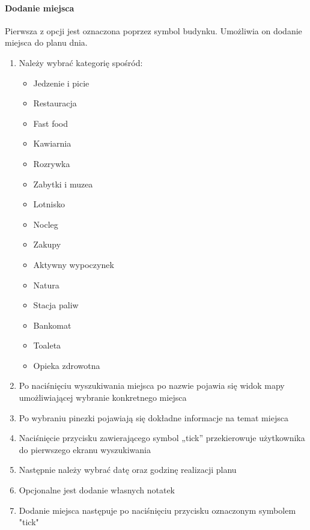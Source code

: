 \documentclass[10pt,twoside,a4paper]{report}
\begin{document}
\paragraph{Dodanie miejsca}
Pierwsza z opcji jest oznaczona poprzez symbol budynku.
Umożliwia on dodanie miejsca do planu dnia.

\begin{enumerate}
\item Należy wybrać kategorię spośród:
\begin{itemize}
\item Jedzenie i picie
\item Restauracja
\item Fast food
\item Kawiarnia
\item Rozrywka
\item Zabytki i muzea
\item Lotnisko
\item Nocleg
\item Zakupy
\item Aktywny wypoczynek
\item Natura
\item Stacja paliw
\item Bankomat
\item Toaleta
\item Opieka zdrowotna
\end{itemize}
\item Po naciśnięciu wyszukiwania miejsca po nazwie pojawia się widok mapy umożliwiającej wybranie konkretnego miejsca
\item Po wybraniu pinezki pojawiają się dokładne informacje na temat miejsca
\item Naciśnięcie przycisku zawierającego symbol „tick” przekierowuje użytkownika do pierwszego ekranu wyszukiwania
\item Następnie należy wybrać datę oraz godzinę realizacji planu
\item Opcjonalne jest dodanie własnych notatek
\item Dodanie miejsca następuje po naciśnięciu przycisku oznaczonym symbolem "tick"
\end{enumerate}
\end{document}

